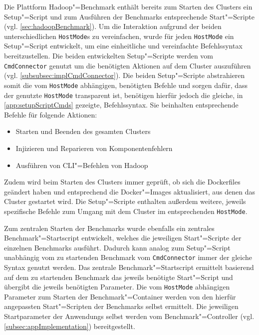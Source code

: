 Die Plattform Hadoop"=Benchmark enthält bereits zum Starten des Clusters ein Setup"=Script und zum Ausführen der Benchmarks entsprechende Start"=Scripte (vgl. \cref{sec:hadoopBenchmark}).
Um die Interaktion aufgrund der beiden unterschiedlichen \texttt{HostMode}s zu vereinfachen, wurde für jeden \texttt{HostMode} ein Setup"=Script entwickelt, um eine einheitliche und vereinfachte Befehlssyntax bereitzustellen.
Die beiden entwickelten Setup"=Scripte werden vom \texttt{CmdConnector} genutzt um die benötigten Aktionen auf dem Cluster auszuführen (vgl. \cref{subsubsec:implCmdConnector}).
Die beiden Setup"=Scripte abstrahieren somit die vom \texttt{HostMode} abhängigen, benötigten Befehle und sorgen dafür, dass der genutzte \texttt{HostMode} transparent ist, benötigen hierfür jedoch die gleiche, in \cref{app:setupScriptCmds} gezeigte, Befehlssyntax.
Sie beinhalten entsprechende Befehle für folgende Aktionen:

\begin{itemize}
    \item Starten und Beenden des gesamten Clusters
    \item Injizieren und Reparieren von Komponentenfehlern
    \item Ausführen von \gls{CLI}"=Befehlen von Hadoop
\end{itemize}

Zudem wird beim Starten des Clusters immer geprüft, ob sich die Dockerfiles geändert haben und entsprechend die Docker"=Images aktualisiert, aus denen das Cluster gestartet wird.
Die Setup"=Scripte enthalten außerdem weitere, jeweils spezifische Befehle zum Umgang mit dem Cluster im entsprechenden \texttt{HostMode}.

Zum zentralen Starten der Benchmarks wurde ebenfalls ein zentrales Benchmark"=Startscript entwickelt, welches die jeweiligen Start"=Scripte der einzelnen Benchmarks ausführt.
Dadurch kann analog zum Setup"=Script unabhängig vom zu startenden Benchmark vom \texttt{CmdConnector} immer der gleiche Syntax genutzt werden.
Das zentrale Benchmark"=Startscript ermittelt basierend auf dem zu startenden Benchmark das jeweils benötigte Start"=Script und übergibt die jeweils benötigten Parameter.
Die vom \texttt{HostMode} abhängigen Parameter zum Starten der Benchmark"=Container werden von den hierfür angepassten Start"=Scripten der Benchmarks selbst ermittelt.
Die jeweiligen Startparameter der \glspl{Anwendung} selbst werden vom Benchmark"=Controller (vgl. \cref{subsec:appImplementation}) bereitgestellt.
